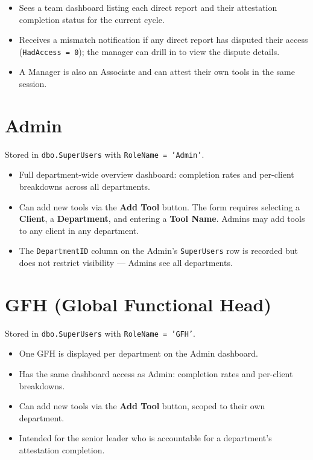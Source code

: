 \documentclass[12pt,a4paper]{report}
\begin{document}
\begin{itemize}
  \item Sees a team dashboard listing each direct report and their attestation completion
        status for the current cycle.
  \item Receives a mismatch notification if any direct report has disputed their access
        (\texttt{HadAccess = 0}); the manager can drill in to view the dispute details.
  \item A Manager is also an Associate and can attest their own tools in the same session.
\end{itemize}

\section{Admin}

Stored in \texttt{dbo.SuperUsers} with \texttt{RoleName = 'Admin'}.

\begin{itemize}
  \item Full department-wide overview dashboard: completion rates and per-client breakdowns
        across all departments.
  \item Can add new tools via the \textbf{Add Tool} button. The form requires selecting a
        \textbf{Client}, a \textbf{Department}, and entering a \textbf{Tool Name}. Admins
        may add tools to any client in any department.
  \item The \texttt{DepartmentID} column on the Admin's \texttt{SuperUsers} row is recorded
        but does not restrict visibility --- Admins see all departments.
\end{itemize}

\section{GFH (Global Functional Head)}

Stored in \texttt{dbo.SuperUsers} with \texttt{RoleName = 'GFH'}.

\begin{itemize}
  \item One GFH is displayed per department on the Admin dashboard.
  \item Has the same dashboard access as Admin: completion rates and per-client breakdowns.
  \item Can add new tools via the \textbf{Add Tool} button, scoped to their own department.
  \item Intended for the senior leader who is accountable for a department's attestation
        completion.
\end{itemize}
\end{document}
